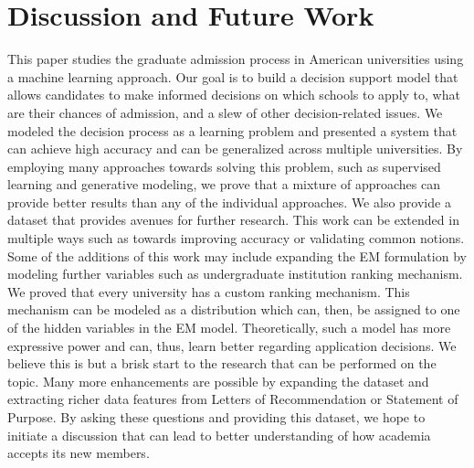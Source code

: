 \documentclass{sig-alternate-05-2015}
\begin{document}
\section{Discussion and Future Work}
\label{sec:discussion}
This paper studies the graduate admission process in American universities using a machine learning approach. Our goal is to build a decision support model that allows candidates to make informed decisions on which schools to apply to, what are their chances of admission, and a slew of other decision-related issues. We modeled the decision process as a learning problem and presented a system that can achieve high accuracy and can be generalized across multiple universities. By employing many approaches towards solving this problem, such as supervised learning and generative modeling, we prove that a mixture of approaches can provide better results than any of the individual approaches. We also provide a dataset that provides avenues for further research. This work can be extended in multiple ways such as towards improving accuracy or validating common notions. Some of the additions of this work may include expanding the EM formulation by modeling further variables such as undergraduate institution ranking mechanism. We proved that every university has a custom ranking mechanism. This mechanism can be modeled as a distribution which can, then, be assigned to one of the hidden variables in the EM model. Theoretically, such a model has more expressive power and can, thus, learn better regarding application decisions. We believe this is but a brisk start to the research that can be performed on the topic. Many more enhancements are possible by expanding the dataset and extracting richer data features from Letters of Recommendation or Statement of Purpose. By asking these questions and providing this dataset, we hope to initiate a discussion that can lead to better understanding of how academia accepts its new members.


%

%
%
\end{document}
